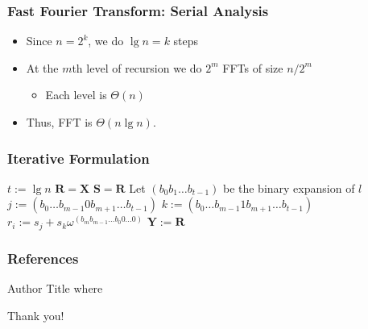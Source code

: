 \documentclass[xcolor=pdftex,dvipsnames,table]{presentation}
\begin{document}
\begin{frame}
	\frametitle{Fast Fourier Transform: Serial Analysis}

	\begin{itemize}
		\item Since $n=2^k$, we do $\lg n=k$ steps
		\item At the $m$th level of recursion we do $2^m$ FFTs of size $n/2^m$
		\begin{itemize}
			\item Each level is $\Theta(n)$
		\end{itemize}
		\item Thus, FFT is $\Theta(n\lg n)$.
	\end{itemize}
\end{frame}

\begin{frame}
	\frametitle{Iterative Formulation}
	\begin{algorithmic}[1]
			\State $t:=\lg n$
			\State $\mathbf{R}=\mathbf{X}$
				\State $\mathbf{S}=\mathbf{R}$
					\State Let $(b_0b_1\ldots b_{t-1})$ be the binary expansion of $l$
					\State $j:=(b_0\ldots b_{m-1}0b_{m+1}\ldots b_{t-1})$
					\State $k:=(b_0\ldots b_{m-1}1b_{m+1}\ldots b_{t-1})$
					\State $r_i:= s_j+s_k\omega^{(b_mb_{m-1}\ldots b_0 0\ldots0)}$
				\EndFor
			\EndFor
			\State $\mathbf{Y}:=\mathbf{R}$
		\EndFunction
	\end{algorithmic}
\end{frame}

\begin{frame}[allowframebreaks]
\frametitle{References}
	\begin{thebibliography}{10}
		Author
		\newblock{} Title
		\newblock{} where
	\end{thebibliography}
\end{frame}

\begin{frame}
\begin{Large}
\begin{center}
Thank you!
\end{center}
\end{Large}
\end{frame}
\end{document}

